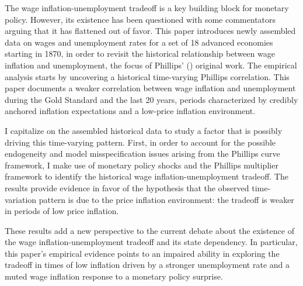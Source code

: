 \documentclass[12pt]{article}
\begin{document}
The wage inflation-unemployment tradeoff is a key building block for monetary policy. However, its existence has been questioned with some commentators arguing that it has flattened out of favor. This paper introduces newly assembled data on wages and unemployment rates for a set of 18 advanced economies starting in 1870, in order to revisit the historical relationship between wage inflation and unemployment, the focus of Phillips' (\citeyear{Phillips1958}) original work. The empirical analysis starts by uncovering a historical time-varying Phillips correlation. This paper documents a weaker correlation between wage inflation and unemployment during the Gold Standard and the last 20 years, periods characterized by credibly anchored inflation expectations and a low-price inflation environment.

I capitalize on the assembled historical data to study a factor that is possibly driving this time-varying pattern. First, in order to account for the possible endogeneity and model misspecification issues arising from the Phillips curve framework, I make use of monetary policy shocks and the Phillips multiplier framework to identify the historical wage inflation-unemployment tradeoff. The results provide evidence in favor of the hypothesis that the observed time-variation pattern is due to the price inflation environment: the tradeoff is weaker in periods of low price inflation.

These results add a new perspective to the current debate about the existence of the wage inflation-unemployment tradeoff and its state dependency. In particular, this paper's empirical evidence points to an impaired ability in exploring the tradeoff in times of low inflation driven by a stronger unemployment rate and a muted wage inflation response to a monetary policy surprise. 






\clearpage
\end{document}
